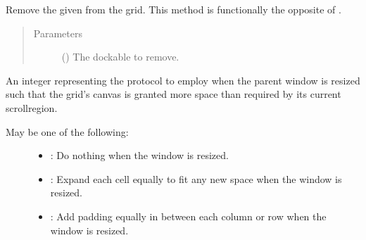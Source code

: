 \documentclass[letterpaper,10pt,english,openany,oneside]{sphinxmanual}
\begin{document}
\begin{fulllineitems}
\begin{fulllineitems}
\begin{quote}
\begin{description}
\end{description}\end{quote}

\end{fulllineitems}


\begin{fulllineitems}
\label{\detokenize{api:spookyconsole.gui.core.Grid.remove_dockable}}
Remove the given   from the grid. This method is functionally the opposite of
.
\begin{quote}\begin{description}
\item[{Parameters}] \leavevmode
{} () \textendash{} The dockable to remove.

\end{description}\end{quote}

\end{fulllineitems}


\begin{fulllineitems}
\label{\detokenize{api:spookyconsole.gui.core.Grid.resize_protocol}}
An integer representing the protocol to employ when the parent window is resized such that the grid’s canvas is
granted more space than required by its current scrollregion.
\begin{description}
\item[{May be one of the following:}] \leavevmode\begin{itemize}
\item {} 
: Do nothing when the window is resized.

\item {} 
: Expand each cell equally to fit any new space when the window is            resized.

\item {} 
: Add padding equally in between each column or row when the window            is resized.


\end{itemize}
\end{description}
\end{fulllineitems}
\end{fulllineitems}
\end{document}
